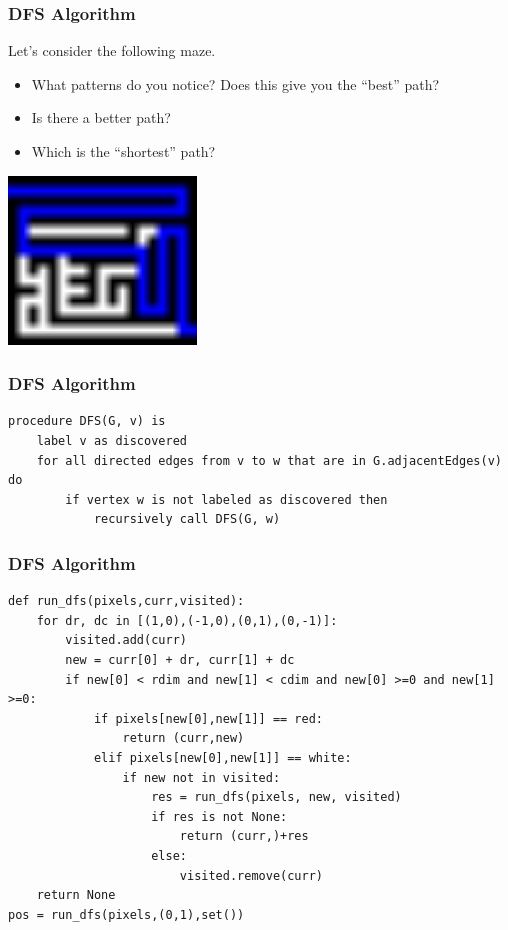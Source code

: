 \documentclass{beamer}
\begin{document}
        \begin{frame}
            \frametitle{DFS Algorithm}
            Let's consider the following maze.
            \begin{itemize}
                \item What patterns do you notice? Does this give you the ``best'' path? 
                \item Is there a better path?
                \item Which is the ``shortest'' path?


            \end{itemize}
        
            \includegraphics[width=5cm,scale=2]{../dfs_out.png}
        
            
            \end{frame}
            \begin{frame}[fragile]
                \frametitle{DFS Algorithm}
\begin{lstlisting}
procedure DFS(G, v) is
    label v as discovered
    for all directed edges from v to w that are in G.adjacentEdges(v) do
        if vertex w is not labeled as discovered then
            recursively call DFS(G, w)
\end{lstlisting}

            \end{frame}

            \begin{frame}[fragile]
                \frametitle{DFS Algorithm}
\begin{lstlisting}
def run_dfs(pixels,curr,visited):
    for dr, dc in [(1,0),(-1,0),(0,1),(0,-1)]:
        visited.add(curr)
        new = curr[0] + dr, curr[1] + dc
        if new[0] < rdim and new[1] < cdim and new[0] >=0 and new[1] >=0:
            if pixels[new[0],new[1]] == red:
                return (curr,new)
            elif pixels[new[0],new[1]] == white:
                if new not in visited:
                    res = run_dfs(pixels, new, visited)
                    if res is not None:
                        return (curr,)+res
                    else:
                        visited.remove(curr)
    return None
pos = run_dfs(pixels,(0,1),set())\end{lstlisting}

            \end{frame}
\end{document}

